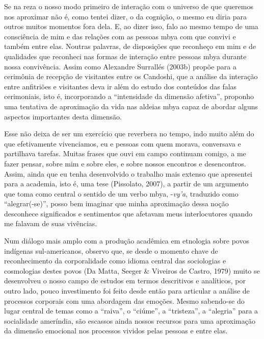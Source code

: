 Se na reza o nosso modo primeiro de interação com o universo de que
queremos nos aproximar não é, como tentei dizer, o da cognição, o mesmo
eu diria para outros muitos momentos fora dela. E, ao dizer isso, falo
ao mesmo tempo de uma consciência de mim e das relações com as pessoas
mbya com que convivi e também entre elas. Noutras palavras, de
disposições que reconheço em mim e de qualidades que reconheci nas
formas de interação entre pessoas mbya durante nossa convivência. Assim
como Alexandre Surrallés (2003b) propõe para a cerimônia de recepção de
visitantes entre os Candoshi, que a análise da interação entre
anfitriões e visitantes deva ir além do estudo dos conteúdos das falas
cerimoniais, isto é, incorporando a ``intensidade da dimensão afetiva'',
proponho uma tentativa de aproximação da vida nas aldeias mbya capaz de
abordar alguns aspectos importantes desta dimensão.

Esse não deixa de ser um exercício que reverbera no tempo, indo muito
além do que efetivamente vivenciamos, eu e pessoas com quem morava,
conversava e partilhava tarefas. Muitas frases que ouvi em campo
continuam comigo, a me fazer pensar, sobre mim e sobre eles, e sobre
nossos encontros e desencontros. Assim, ainda que eu tenha desenvolvido
o trabalho mais extenso que apresentei para a academia, isto é, uma
tese (Pissolato, 2007), a partir de um argumento que toma como central
o sentido de um verbo mbya, -\emph{vy’a}, traduzido como ``alegrar(-se)'', posso
bem imaginar que minha aproximação dessa noção desconhece significados
e sentimentos que afetavam meus interlocutores quando me falavam de
suas vivências.

Num diálogo mais amplo com a produção acadêmica em etnologia sobre povos
indígenas sul-americanos, observo que, se desde o momento chave de
reconhecimento  da corporalidade como idioma central das sociologias e
cosmologias destes povos (Da Matta, Seeger \& Viveiros de Castro,
1979) muito se desenvolveu o nosso campo de estudos em termos
descritivos e analíticos, por outro lado, pouco investimento foi feito
desde então para articular a análise de processos corporais com uma
abordagem das emoções. Mesmo sabendo-se do lugar central de temas como
a ``raiva'', o ``ciúme'', a ``tristeza'', a ``alegria'' para a socialidade
ameríndia, são escassos ainda nossos recursos para uma aproximação da
dimensão emocional nos processos vividos pelas pessoas e entre elas.

